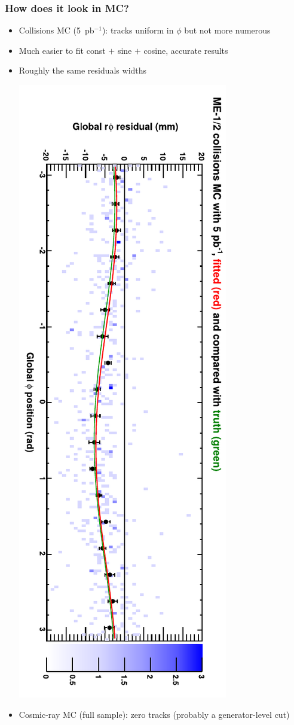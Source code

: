 \documentclass[compress]{beamer}
\begin{document}
\begin{frame}
\frametitle{How does it look in MC?}

\begin{itemize}\setlength{\itemsep}{0.25 cm}
\item Collisions MC (5~pb$^{-1}$): tracks uniform in $\phi$ but not more numerous
\item Much easier to fit const $+$ sine $+$ cosine, accurate results
\item Roughly the same residuals widths

\vspace{0.5 cm}
\includegraphics[height=\linewidth, angle=90]{mccsc_example_5pb.pdf}

\item Cosmic-ray MC (full sample): zero tracks {\scriptsize (probably a generator-level cut)}
\end{itemize}
\end{frame}
\end{document}
